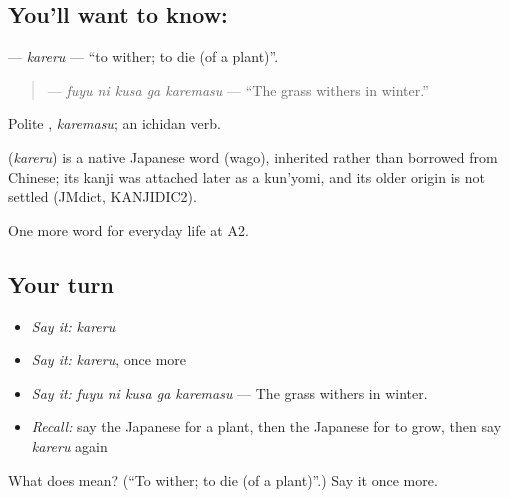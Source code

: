 \subsection*{You'll want to know: }
\textbf{} — \emph{kareru} — \textquotedblleft{}to wither; to die (of a plant)\textquotedblright{}.

\begin{quote}
\textbf{  } — \emph{fuyu ni kusa ga karemasu} — \textquotedblleft{}The grass withers in winter.\textquotedblright{}
\end{quote}

Polite \textbf{}, \emph{karemasu}; an ichidan verb.

\begin{cousinweb}
\textbf{} (\emph{kareru}) is a native Japanese word (wago), inherited rather than borrowed from Chinese; its kanji was attached later as a kun'yomi, and its older origin is not settled (JMdict, KANJIDIC2).
\end{cousinweb}

\begin{grammarlens}[title={What you've built}]
One more word for everyday life at A2.
\end{grammarlens}

\subsection*{Your turn}
\begin{itemize}
\raggedright
  \item \emph{Say it:} \emph{kareru}
  \item \emph{Say it:} \emph{kareru}, once more
  \item \emph{Say it:} \emph{fuyu ni kusa ga karemasu} — The grass withers in winter.
  \item \emph{Recall:} say the Japanese for a plant, then the Japanese for to grow, then say \emph{kareru} again
\end{itemize}

\begin{tcolorbox}[breakable,colback=teal!4,colframe=teal!35!black,title={Before you move on}]
What does  mean? (\textquotedblleft{}To wither; to die (of a plant)\textquotedblright{}.) Say it once more.
\end{tcolorbox}
